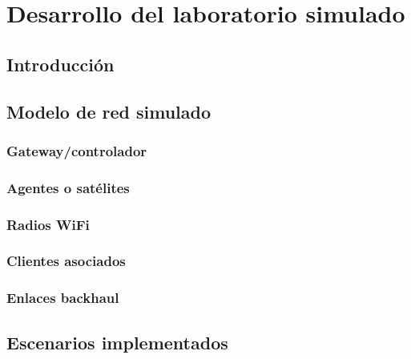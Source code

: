 %
%

\chapter{Desarrollo del laboratorio simulado}
\label{cha:desarrollo-laboratorio-simulado}

\section{Introducción}
\label{sec:introduccion-desarrollo-laboratorio-simulado}


\section{Modelo de red simulado}
\label{sec:modelo-red-simulado}

\subsection{Gateway/controlador}
\label{subsec:gateway-controlador}

\subsection{Agentes o satélites}
\label{subsec:agentes-o-satelites}

\subsection{Radios WiFi}
\label{subsec:radios-wifi}

\subsection{Clientes asociados}
\label{subsec:clientes-asociados}

\subsection{Enlaces backhaul}
\label{subsec:enlaces-backhaul}


\section{Escenarios implementados}
\label{sec:escenarios-implementados}

